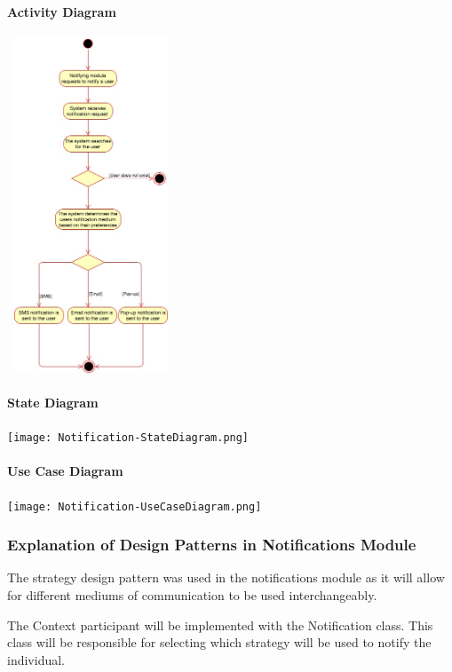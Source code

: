 \documentclass[runningheads,a4paper]{article}
\begin{document}
\paragraph{Activity Diagram}
\begin{center}
\includegraphics[height=10cm,width=5cm]{ActivityDiagram.png}\\ 
\end{center}
\paragraph{State Diagram}
\begin{center}
\texttt{[image: Notification-StateDiagram.png]}\\ 
\end{center}
\paragraph{Use Case Diagram}
\begin{center}
\texttt{[image: Notification-UseCaseDiagram.png]}\\ 
\end{center}

\subsubsection{Explanation of Design Patterns in Notifications Module}
The strategy design pattern was used in the notifications module as it will allow for different mediums of communication to be used interchangeably.

The Context participant will be implemented with the Notification class. This class will be responsible for selecting which strategy will be used to notify the individual.
\end{document}
